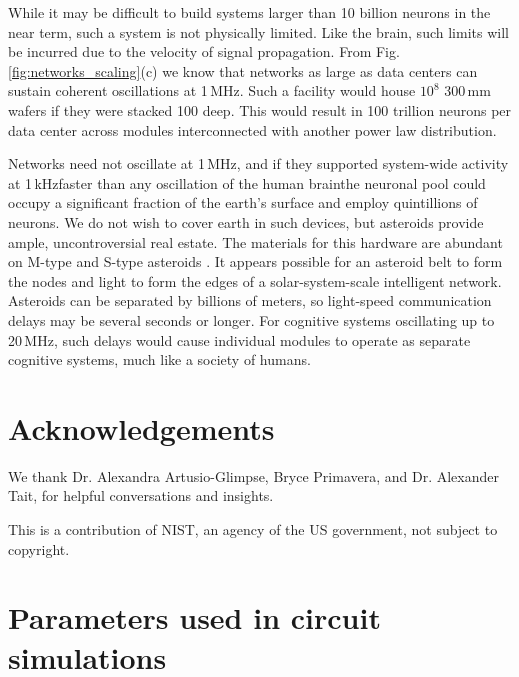 \documentclass[twocolumn]{article}
\begin{document}
While it may be difficult to build systems larger than 10 billion neurons in the near term, such a system is not physically limited. Like the brain, such limits will be incurred due to the velocity of signal propagation. From Fig. \ref{fig:networks_scaling}(c) we know that networks as large as data centers can sustain coherent oscillations at 1\,MHz. Such a facility would house $10^8$ 300\,mm wafers if they were stacked 100 deep. This would result in 100 trillion neurons per data center across modules interconnected with another power law distribution. 

Networks need not oscillate at 1\,MHz, and if they supported system-wide activity at 1\,kHz\textemdash faster than any oscillation of the human brain\textemdash the neuronal pool could occupy a significant fraction of the earth's surface and employ quintillions of neurons. We do not wish to cover earth in such devices, but asteroids provide ample, uncontroversial real estate. The materials for this hardware are abundant on M-type and S-type asteroids \cite{mufo2017,astra,bu1999,shcl2010,necl2014}. It appears possible for an asteroid belt to form the nodes and light to form the edges of a solar-system-scale intelligent network. Asteroids can be separated by billions of meters, so light-speed communication delays may be several seconds or longer. For cognitive systems oscillating up to 20\,MHz, such delays would cause individual modules to operate as separate cognitive systems, much like a society of humans. 

\section{Acknowledgements}
We thank Dr. Alexandra Artusio-Glimpse, Bryce Primavera, and Dr. Alexander Tait, for helpful conversations and insights.

\vspace{0.5em}
This is a contribution of NIST, an agency of the US government, not subject to copyright.
	
\newpage
\appendix
	
\section{\label{apx:circuitParameters}Parameters used in circuit simulations}
\end{document}
